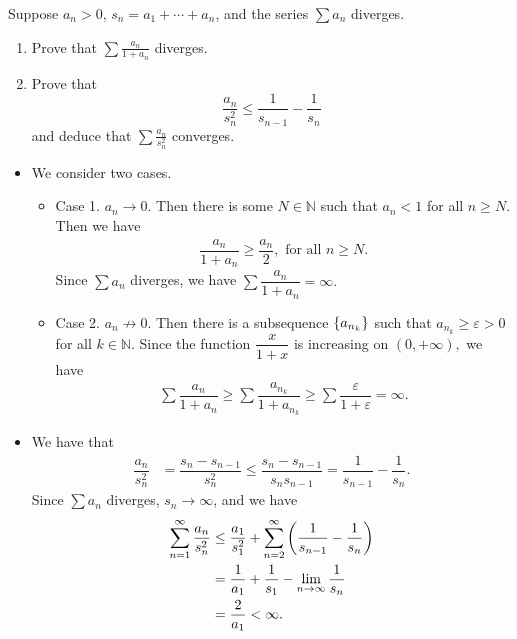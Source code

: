 \begin{problem}
Suppose $a_n > 0$, $s_n = a_1 + \cdots + a_n$, and the series $\sum a_n$ diverges.
\begin{enumerate}
    \item[(a)] Prove that $\sum \frac{a_n}{1 + a_n}$ diverges.
    \item[(b)] Prove that
    $$ \frac{a_n}{s_n^2} \leq \frac{1}{s_{n-1}} - \frac{1}{s_n} $$
    and deduce that $\sum \frac{a_n}{s_n^2}$ converges.
\end{enumerate}
\begin{solution}
\begin{itemize}
    \item[(a)] We consider two cases.
    \begin{itemize}
        \item[] Case 1. $a_n\rightarrow0$. Then there is some $N\in\mathbb{N}$ such that $a_n<1$ for all $n\ge N.$ Then we have 
        \begin{align*}
            \dfrac{a_n}{1+a_n}\ge\dfrac{a_n}{2},\text{ for all }n\ge N.
        \end{align*}
        Since $\sum a_n$ diverges, we have $\sum \dfrac{a_n}{1+a_n}=\infty.$
        \item[]Case 2. $a_n\not \rightarrow0$. Then there is a subsequence $\left\{ a_{n_k}\right\}$ such that $a_{n_k}\ge \varepsilon>0$ for all $k\in\mathbb{N}.$ Since the function $\dfrac{x}{1+x}$ is increasing on $(0,+\infty),$ we have 
        \begin{align*}
            \sum\dfrac{a_n}{1+a_n}\ge \sum\dfrac{{a_{n_k}}}{1+a_{n_k}}\ge \sum\dfrac{\varepsilon}{1+\varepsilon}=\infty.
        \end{align*}
    \end{itemize}
    \item[(b)]We have that 
    \begin{align*}
    \dfrac{a_n}{s_{n}^2}&=\dfrac{s_{n}-s_{n-1}}{s_n^2}\le \dfrac{s_{n}-s_{n-1}}{s_n s_{n-1}}=\dfrac{1}{s_{n-1}}-\dfrac{1}{s_n}. 
    \end{align*}
  Since $\sum a_n$ diverges, $s_n\rightarrow\infty$, and we have
    \begin{align*}
        \sum_{n=1}^\infty \dfrac{a_n}{s_n^2}&\le \dfrac{a_1}{s_1^2}+ \sum_{n=2}^\infty \left( \dfrac{1}{s_{n-1}}-\dfrac{1}{s_{n}}\right)\\
        &= \dfrac{1}{a_1}+\dfrac{1}{s_1}-\lim_{n\rightarrow\infty}\dfrac{1}{s_n}\\
        &=\dfrac{2}{a_1}<\infty.
    \end{align*}
\end{itemize}
\end{solution}
\end{problem}


